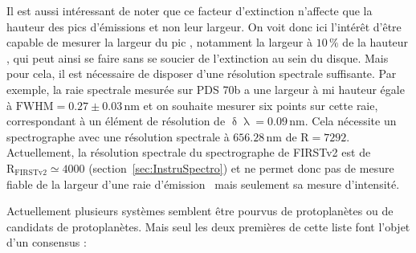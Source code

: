 Il est aussi intéressant de noter que ce facteur d'extinction n'affecte que la hauteur des pics d'émissions et non leur largeur. On voit donc ici l'intérêt d'être capable de mesurer la largeur du pic \ha, notamment la largeur à $10 \, \%$ de la hauteur \Wd, qui peut ainsi se faire sans se soucier de l'extinction au sein du disque. Mais pour cela, il est nécessaire de disposer d'une résolution spectrale suffisante. Par exemple, la raie spectrale mesurée sur PDS 70b \citep{haffert2019} a une largeur à mi hauteur égale à $\text{FWHM} = 0.27 \pm 0.03 \,$nm et on souhaite mesurer six points sur cette raie, correspondant à un élément de résolution de $\updelta\uplambda = 0.09 \,$nm. Cela nécessite un spectrographe avec une résolution spectrale à $656.28 \,$nm de $\text{R} = 7292$. Actuellement, la résolution spectrale du spectrographe de \ac{FIRSTv2} est de $\text{R}_{\text{FIRSTv2}} \simeq 4000$ (section~\ref{sec:InstruSpectro}) et ne permet donc pas de mesure fiable de la largeur d'une raie d'émission \ha~mais seulement sa mesure d'intensité.

Actuellement plusieurs systèmes semblent être pourvus de protoplanètes ou de candidats de protoplanètes. Mais seul les deux premières de cette liste font l'objet d'un consensus : 

